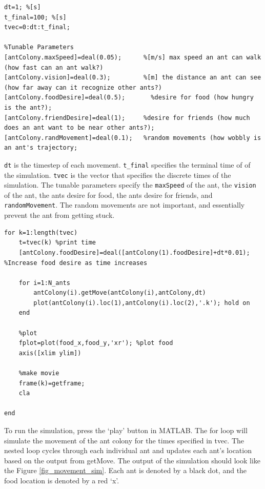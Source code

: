 \documentclass[12pt]{article}
\begin{document}
\begin{lstlisting}[frame=single]
%% Run movement simulation
dt=1; %[s]
t_final=100; %[s]
tvec=0:dt:t_final;

%Tunable Parameters
[antColony.maxSpeed]=deal(0.05);      %[m/s] max speed an ant can walk (how fast can an ant walk?)
[antColony.vision]=deal(0.3);         %[m] the distance an ant can see (how far away can it recognize other ants?)
[antColony.foodDesire]=deal(0.5);       %desire for food (how hungry is the ant?);
[antColony.friendDesire]=deal(1);     %desire for friends (how much does an ant want to be near other ants?);
[antColony.randMovement]=deal(0.1);   %random movements (how wobbly is an ant's trajectory;
\end{lstlisting}

\lstinline|dt| is the timestep of each movement. \lstinline|t_final| specifies the terminal time of of the simulation. \lstinline|tvec| is the vector that specifies the discrete times of the simulation. 
The tunable parameters specify the \lstinline|maxSpeed| of the ant, the \lstinline|vision| of the ant, the ants desire for food, the ants desire for friends, and \lstinline|randomMovement|. The random movements are not important, and essentially prevent the ant from getting stuck.
  

\begin{lstlisting}[frame=single]
for k=1:length(tvec)
    t=tvec(k) %print time
    [antColony.foodDesire]=deal([antColony(1).foodDesire]+dt*0.01); %Increase food desire as time increases

    for i=1:N_ants        
        antColony(i).getMove(antColony(i),antColony,dt)
        plot(antColony(i).loc(1),antColony(i).loc(2),'.k'); hold on
    end
    
    %plot
    fplot=plot(food_x,food_y,'xr'); %plot food
    axis([xlim ylim])
    
    %make movie
    frame(k)=getframe;
    cla
    
end
\end{lstlisting}

To run the simulation, press the `play' button in MATLAB. The for loop will simulate the movement of the ant colony for the times specified in tvec. The nested loop cycles through each individual ant and updates each ant's location based on the output from getMove. The output of the simulation should look like the Figure \ref{fig_movement_sim}. Each ant is denoted by a black dot, and the food location is denoted by a red `x'.
\end{document}
